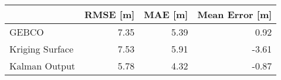 \begin{tabular}{lrrr}
\toprule
 & RMSE [m] & MAE [m] & Mean Error [m] \\
\midrule
GEBCO & 7.35 & 5.39 & 0.92 \\
Kriging Surface & 7.53 & 5.91 & -3.61 \\
Kalman Output & 5.78 & 4.32 & -0.87 \\
\bottomrule
\end{tabular}

